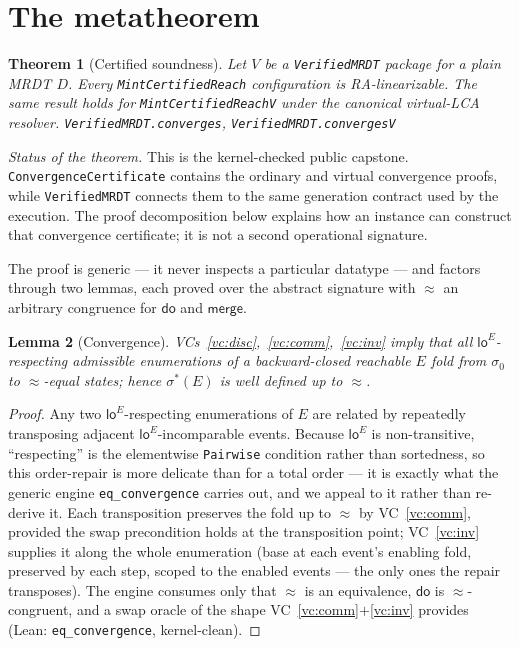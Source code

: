 \documentclass[11pt]{article}
\newtheorem{theorem}{Theorem}[section]
\newtheorem{lemma}[theorem]{Lemma}
\newcommand{\loE}[1]{\mathsf{lo}^{#1}}
\newcommand{\lean}[1]{\texttt{#1}}
\newcommand{\st}{\sigma}
\newcommand{\ini}{\st_0}
\newcommand{\dodo}{\mathsf{do}}
\newcommand{\merge}{\mathsf{merge}}
\newcommand{\eqobs}{\approx}
\newcommand{\sigmacan}{\st^{\ast}}
\begin{document}
\section{The metatheorem}\label{sec:meta}

\begin{theorem}[Certified soundness]\label{thm:meta}
Let $V$ be a \lean{VerifiedMRDT} package for a plain MRDT $D$. Every
\lean{MintCertifiedReach} configuration is RA-linearizable. The same result
holds for \lean{MintCertifiedReachV} under the canonical virtual-LCA resolver.
\hfill\lean{VerifiedMRDT.converges}, \lean{VerifiedMRDT.convergesV}
\end{theorem}

\emph{Status of the theorem.} This is the kernel-checked public capstone.
\lean{ConvergenceCertificate} contains the ordinary and virtual convergence
proofs, while \lean{VerifiedMRDT} connects them to the same generation contract
used by the execution. The proof decomposition below explains how an instance
can construct that convergence certificate; it is not a second operational
signature.

The proof is generic --- it never inspects a particular datatype --- and factors through two
lemmas, each proved over the abstract signature with $\eqobs$ an arbitrary congruence for
$\dodo$ and $\merge$.

\begin{lemma}[Convergence]\label{lem:conv}
VCs~\ref{vc:disc},~\ref{vc:comm},~\ref{vc:inv} imply that all $\loE{E}$-respecting admissible
enumerations of a backward-closed reachable $E$ fold from $\ini$ to $\eqobs$-equal states;
hence $\sigmacan(E)$ is well defined up to $\eqobs$.
\end{lemma}
\begin{proof}
Any two $\loE{E}$-respecting enumerations of $E$ are related by repeatedly transposing adjacent
$\loE{E}$-incomparable events. Because $\loE{E}$ is non-transitive, ``respecting'' is the elementwise
\lean{Pairwise} condition rather than sortedness, so this order-repair is more delicate than
for a total order --- it is exactly what the generic engine \lean{eq\_convergence} carries out,
and we appeal to it rather than re-derive it. Each transposition preserves the fold up to
$\eqobs$ by VC~\ref{vc:comm}, provided the swap precondition holds at the transposition point;
VC~\ref{vc:inv} supplies it along the whole enumeration (base at each event's enabling fold,
preserved by each step, scoped to the enabled events --- the only ones the repair transposes).
The engine consumes only that $\eqobs$ is an equivalence, $\dodo$ is $\eqobs$-congruent, and a
swap oracle of the shape VC~\ref{vc:comm}$+$\ref{vc:inv} provides (Lean: \lean{eq\_convergence},
kernel-clean).
\end{proof}
\end{document}
